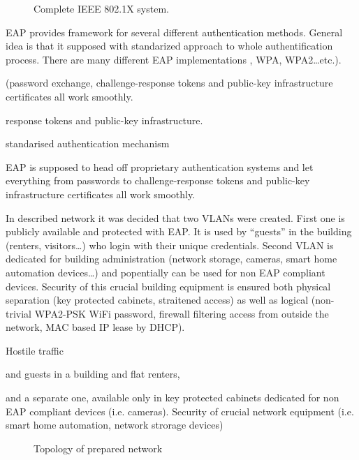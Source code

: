 \documentclass{llncs}
\begin{document}
 



\begin{figure}
	\vspace{-15pt}
	\caption{Complete IEEE 802.1X system.}
\end{figure}



EAP provides framework for several different authentication methods. General
idea is that it supposed  with standarized
approach to whole authentification process. There are many different EAP
implementations , WPA, WPA2\ldots etc.).


 (password exchange,
challenge-response tokens and public-key infrastructure certificates all work smoothly.

 response tokens and public-key infrastructure.


standarised authentication mechanism

 EAP is supposed to head off
proprietary authentication systems and let everything from passwords to challenge-response tokens and public-key
infrastructure certificates all work smoothly.

In described network it was decided that two VLANs were created. First one is
publicly available and protected with EAP. It is used by ``guests'' in the building
(renters, visitors\ldots) who login with their unique credentials. Second VLAN
is dedicated for building administration (network storage, cameras, smart home
automation devices\ldots) and popentially can be used for non EAP compliant
devices. Security of this crucial building equipment is ensured both physical
separation (key protected cabinets, straitened access) as well as logical
(non-trivial WPA2-PSK WiFi password, firewall filtering access from outside the
network, MAC based IP lease by DHCP). 

Hostile traffic

and guests in a building and
flat renters,

 and a separate one, available only in
key protected cabinets dedicated for non EAP compliant devices (i.e. cameras).
Security of crucial network equipment (i.e. smart home automation, network
strorage devices)
 




\begin{figure}
\vspace{-15pt}
\caption{Topology of prepared network}
\end{figure}
\end{document}
